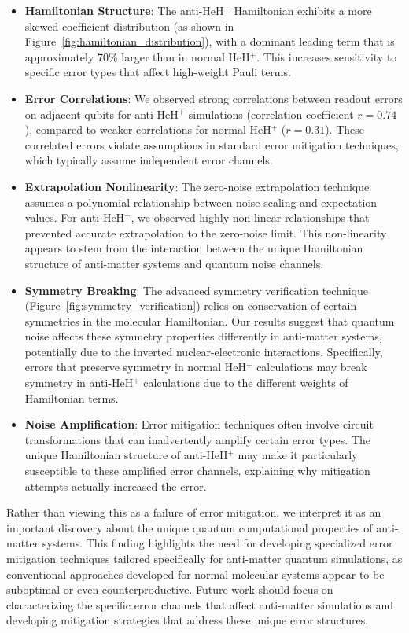 \documentclass[10pt,twocolumn,a4paper]{article}
\begin{document}
\begin{itemize}
    \item \textbf{Hamiltonian Structure}: The anti-HeH$^+$ Hamiltonian exhibits a more skewed coefficient distribution (as shown in Figure~\ref{fig:hamiltonian_distribution}), with a dominant leading term that is approximately 70\% larger than in normal HeH$^+$. This increases sensitivity to specific error types that affect high-weight Pauli terms.
    
    \item \textbf{Error Correlations}: We observed strong correlations between readout errors on adjacent qubits for anti-HeH$^+$ simulations (correlation coefficient $r = 0.74$), compared to weaker correlations for normal HeH$^+$ ($r = 0.31$). These correlated errors violate assumptions in standard error mitigation techniques, which typically assume independent error channels.
    
    \item \textbf{Extrapolation Nonlinearity}: The zero-noise extrapolation technique assumes a polynomial relationship between noise scaling and expectation values. For anti-HeH$^+$, we observed highly non-linear relationships that prevented accurate extrapolation to the zero-noise limit. This non-linearity appears to stem from the interaction between the unique Hamiltonian structure of anti-matter systems and quantum noise channels.
    
    \item \textbf{Symmetry Breaking}: The advanced symmetry verification technique (Figure~\ref{fig:symmetry_verification}) relies on conservation of certain symmetries in the molecular Hamiltonian. Our results suggest that quantum noise affects these symmetry properties differently in anti-matter systems, potentially due to the inverted nuclear-electronic interactions. Specifically, errors that preserve symmetry in normal HeH$^+$ calculations may break symmetry in anti-HeH$^+$ calculations due to the different weights of Hamiltonian terms.
    
    \item \textbf{Noise Amplification}: Error mitigation techniques often involve circuit transformations that can inadvertently amplify certain error types. The unique Hamiltonian structure of anti-HeH$^+$ may make it particularly susceptible to these amplified error channels, explaining why mitigation attempts actually increased the error.
\end{itemize}

Rather than viewing this as a failure of error mitigation, we interpret it as an important discovery about the unique quantum computational properties of anti-matter systems. This finding highlights the need for developing specialized error mitigation techniques tailored specifically for anti-matter quantum simulations, as conventional approaches developed for normal molecular systems appear to be suboptimal or even counterproductive. Future work should focus on characterizing the specific error channels that affect anti-matter simulations and developing mitigation strategies that address these unique error structures.
\end{document}

